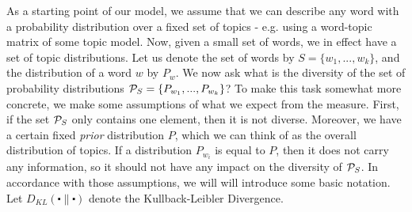 As a starting point of our model, we assume that we can describe any
word with a probability distribution over a fixed set of topics -
e.g. using a word-topic matrix of some topic model. Now, given a small
set of words, we in effect have a set of topic distributions. Let us
denote the set of words by $S=\{w_1,...,w_k\}$, and the distribution
of a word $w$ by $P_w$.  We now ask
what is the diversity of the set of probability
distributions ${\mathcal P}_S=\{P_{w_1},...,P_{w_k}\}$? To make this task
somewhat more concrete, we make some 
assumptions of what we expect from the measure. First, if the set
${\mathcal P}_S$ only contains one element, then it is not diverse. Moreover,
we have a certain fixed {\em prior} distribution $P$, which we
can think of as the overall distribution of topics. If a distribution
$P_{w_i}$ is equal to $P$, then it does not carry any information, so
it should not have any impact on the diversity of ${\mathcal P}_S$. In
accordance with those assumptions, we will will introduce some basic
notation. Let $D_{KL}(\centerdot\|\centerdot)$ denote the
Kullback-Leibler Divergence.
